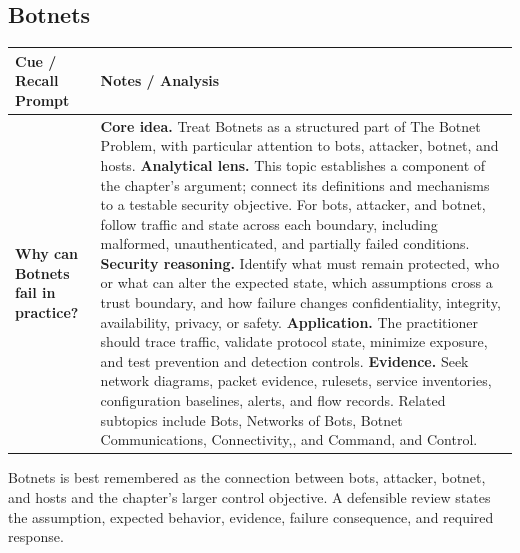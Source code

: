 \documentclass[11pt]{article}
\newcommand{\CornellHeader}{%
\rowcolor{Navy}\color{white}\bfseries Cue / Recall Prompt & \color{white}\bfseries Notes / Analysis\\\hline}
\newcommand{\CornellRow}[2]{%
\cellcolor{CueGray}\RaggedRight\textbf{#1} & \RaggedRight #2\\\hline}
\begin{document}
\subsection*{Botnets}
\begin{longtable}{>{\RaggedRight\arraybackslash}p{}|>{\RaggedRight\arraybackslash}p{}}
\CornellHeader
\CornellRow{Why can Botnets fail in practice?}{\textbf{Core idea.} Treat Botnets as a structured part of The Botnet Problem, with particular attention to bots, attacker, botnet, and hosts. \textbf{Analytical lens.} This topic establishes a component of the chapter's argument; connect its definitions and mechanisms to a testable security objective. For bots, attacker, and botnet, follow traffic and state across each boundary, including malformed, unauthenticated, and partially failed conditions. \textbf{Security reasoning.} Identify what must remain protected, who or what can alter the expected state, which assumptions cross a trust boundary, and how failure changes confidentiality, integrity, availability, privacy, or safety. \textbf{Application.} The practitioner should trace traffic, validate protocol state, minimize exposure, and test prevention and detection controls. \textbf{Evidence.} Seek network diagrams, packet evidence, rulesets, service inventories, configuration baselines, alerts, and flow records. Related subtopics include Bots, Networks of Bots, Botnet Communications, Connectivity,, and Command, and Control.}
\end{longtable}
\begin{topicsummary}
Botnets is best remembered as the connection between bots, attacker, botnet, and hosts and the chapter's larger control objective. A defensible review states the assumption, expected behavior, evidence, failure consequence, and required response.
\end{topicsummary}
\end{document}

